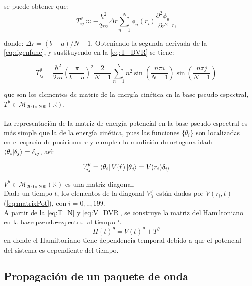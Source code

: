 se puede obtener que: \cite{Tannor:2006}\cite{Colbert1992}
\begin{equation}
  \label{eq:T_DVR}
  T^{\theta}_{ij}\approx -\frac{\hbar^2}{2m}\Delta r\sum_{n=1}^{N}\phi_n(r_i)\frac{\partial^2\phi_n}{\partial r^2}\biggr\rvert_{r_j}
\end{equation}

donde: $\Delta r = (b-a)/N-1$. Obteniendo la segunda derivada de la \autoref{eq:eigenfunc}, y sustituyendo en la \autoref{eq:T_DVR} se tiene:

\begin{equation}
  \label{eq:T_N}
  T^{\theta}_{ij}=\frac{\hbar^2}{2m}\left(\frac{\pi}{b-a} \right)^2\frac{2}{N-1}\sum_{n=1}^Nn^2\sin\left(\frac{n\pi i}{N-1} \right)\sin\left(\frac{n\pi j}{N-1} \right)
\end{equation}

que son los elementos de matriz de la energía cinética en la base pseudo-espectral, $T^{\theta}\in \mathcal{M}_{200\times200}(\mathbb{R})$.
\\
\\
La representación de la matriz de energía potencial en la base pseudo-espectral es más simple que la de la energía cinética, pues 
las funciones $\{\theta_i\}$ son localizadas en el espacio de posiciones $r$ y cumplen la condición de ortogonalidad: $\bra{\theta_i}\ket{\theta_j}= \delta_{ij}$, así:

\begin{equation}
  \label{eq:V_DVR}
  V^{\theta}_{ij}= \bra{\theta_i}V(\hat{r})\ket{\theta_j}=V(r_i)\delta_{ij}
\end{equation}

$V^{\theta}\in \mathcal{M}_{200\times200}(\mathbb{R})$ es una matriz diagonal.
\\
Dado un tiempo $t$, los elementos de la diagonal $V^{\theta}_{ii}$ están dados por $V(r_i,t)$ (\autoref{eq:matrixPot}), con $i=0,..,199$.
\\
A partir de la \autoref{eq:T_N} y \autoref{eq:V_DVR}, se construye la matriz del Hamiltoniano en la base pseudo-espectral al tiempo $t$:
\begin{equation}
  \label{eq:H_DVR}
  H(t)^{\theta} = V(t)^{\theta}+T^{\theta}
\end{equation}
en donde el Hamiltoniano tiene dependencia temporal debido a que el potencial del sistema es dependiente del tiempo.

\subsection{Propagación de un paquete de onda}

